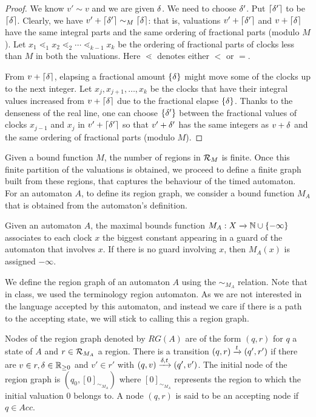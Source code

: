 \begin{proof}
We know $v' \sim v$ and we are given $\delta$. We need to choose $\delta'$. Put $\lceil \delta' \rceil$ to be $\lceil \delta \rceil$. Clearly, we have $v' + \lceil \delta' \rceil \sim_M \lceil \delta \rceil$: that is, valuations $v' + \lceil \delta' \rceil$ and $v + \lceil \delta \rceil$ have the same integral parts and the same ordering of fractional parts (modulo $M$). Let $x_1 \lessdot_1 x_2 \lessdot_2 \cdots \lessdot_{k - 1} x_k$ be the ordering of fractional parts of clocks less than $M$ in both the valuations. Here $\lessdot$ denotes either $<$ or $=$. 

From $v + \lceil \delta \rceil$, elapsing a fractional amount $\{\delta\}$ might move some of the clocks up to the next integer. Let $x_j, x_{j + 1}, \dots, x_k$ be the clocks that have their integral values increased from $v + \lceil \delta \rceil$ due to the fractional elapse $\{\delta\}$. Thanks to the denseness of the real line, one can choose $\{\delta'\}$ between the fractional values of clocks $x_{j - 1}$ and $x_j$ in $v' + \lceil \delta' \rceil$ so that $v' + \delta'$ has the same integers as $v + \delta$ and the same ordering of fractional parts (modulo $M$).
\end{proof}

Given a bound function $M$, the number of regions in ${\mathcal R}_M$ is finite. Once this finite partition of the valuations is obtained, we proceed to define a finite graph built from these regions, that captures the behaviour of the timed automaton. For an automaton $A$, to define its region graph, we consider a bound function $M_A$ that is obtained from the automaton’s definition.

\begin{definition}
Given an automaton $A$, the maximal bounds function $M_A: X \xrightarrow{} \mathbb{N} \cup \{-\infty\}$ associates to each clock $x$ the biggest constant appearing in a guard of the automaton that involves $x$. If there is no guard involving $x$, then $M_A(x)$ is assigned $-\infty$.
\end{definition}

We define the region graph of an automaton $A$ using the $\sim_{M_A}$ relation. Note that in class, we used the terminology region automaton. As we are not interested in the language accepted by this automaton, and instead we care if there is a path to the accepting state, we will stick to calling this a region graph.

\begin{definition}
Nodes of the region graph denoted by $RG(A)$ are of the form $(q, r)$ for $q$ a state of $A$ and $r \in {\mathcal R}_{M_A}$ a region. There is a transition $(q, r) \xrightarrow{t} (q', r')$ if there are $v \in r, \delta \in \mathbb{R}_{\ge 0}$ and $v' \in r'$ with $(q, v) \xrightarrow{\delta, t} (q', v')$. The initial node of the region graph is $(q_0, [0]_{\sim_{M_A}})$ where $[0]_{\sim_{M_A}}$ represents the region to which the initial valuation $0$ belongs to. A node $(q, r)$ is said to be an accepting node if $q \in Acc$.
\end{definition}

